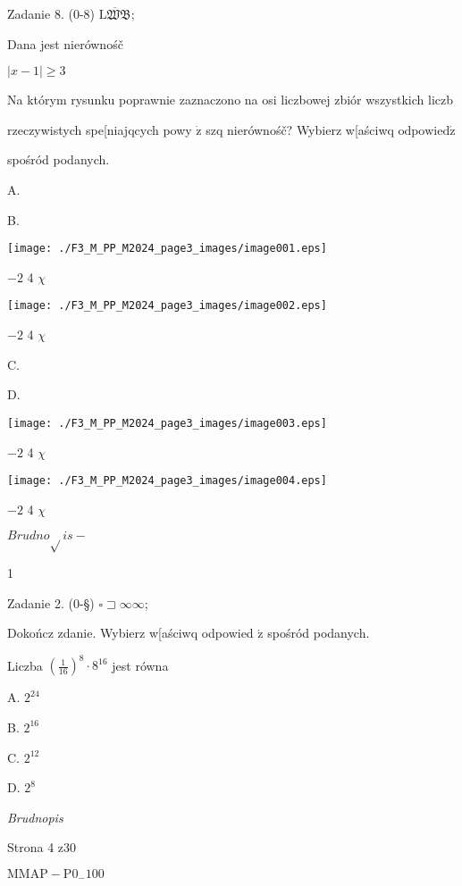 \documentclass[a4paper,12pt]{article}
\begin{document}
Zadanie 8. (0-8) $\overline{\mathrm{L}\mathfrak{W}\mathfrak{B}}$;

Dana jest nierównośč

$|x-1|\geq 3$

Na którym rysunku poprawnie zaznaczono na osi liczbowej zbiór wszystkich liczb

rzeczywistych spe[niajqcych powy $\dot{\mathrm{z}}$ szq nierównośč? Wybierz w[aściwq $\mathrm{o}\mathrm{d}\mathrm{p}\mathrm{o}\mathrm{w}\mathrm{i}\mathrm{e}\mathrm{d}\acute{\mathrm{z}}$

spośród podanych.

A.

B.
\begin{center}
\texttt{[image: ./F3\_M\_PP\_M2024\_page3\_images/image001.eps]}
\end{center}
$-2$  4  $\chi$
\begin{center}
\texttt{[image: ./F3\_M\_PP\_M2024\_page3\_images/image002.eps]}
\end{center}
$-2$  4  $\chi$

C.

D.
\begin{center}
\texttt{[image: ./F3\_M\_PP\_M2024\_page3\_images/image003.eps]}
\end{center}
$-2$  4  $\chi$
\begin{center}
\texttt{[image: ./F3\_M\_PP\_M2024\_page3\_images/image004.eps]}
\end{center}
$-2$  4  $\chi$

$Brudno\sqrt{}is -$

1

Zadanie 2. (0-\S) $\square \sqsupset\infty\infty$;

Dokończ zdanie. Wybierz w[aściwq odpowied $\acute{\mathrm{z}}$ spośród podanych.

Liczba $(\displaystyle \frac{1}{16})^{8}\cdot 8^{16}$ jest równa

A. $2^{24}$

B. $2^{16}$

C. $2^{12}$

D. $2^{8}$

{\it Brudnopis}

Strona 4 z30

$\mathrm{M}\mathrm{M}\mathrm{A}\mathrm{P}-\mathrm{P}0_{-}100$
\end{document}
